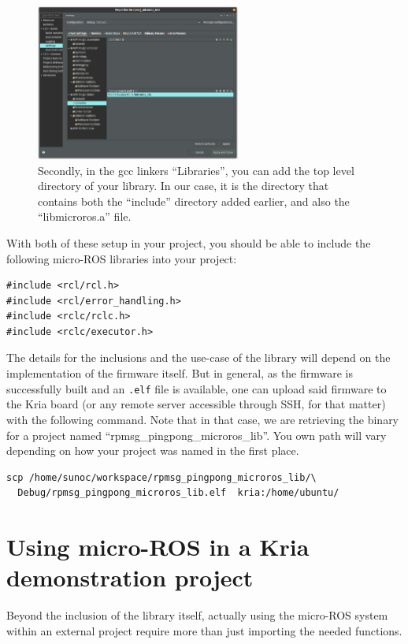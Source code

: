 \documentclass[10pt]{article}
\begin{document}
\begin{figure}[H]
  \centering
  \includegraphics[width=0.6\textwidth]{./img/vitis_new/include2}
  \caption{Secondly, in the gcc linkers ``Libraries'', you can add the top level directory of your library. In our case, it is the
    directory that contains both the ``include'' directory added earlier, and also the ``libmicroros.a'' file.}
\end{figure}

With both of these setup in your project, you should be able to include the following micro-ROS libraries into your project:
\begin{tcolorbox}
\begin{verbatim}
#include <rcl/rcl.h>
#include <rcl/error_handling.h>
#include <rclc/rclc.h>
#include <rclc/executor.h>
\end{verbatim}
\end{tcolorbox}

The details for the inclusions and the use-case of the library will depend on the implementation of the firmware
itself.
But in general, as the firmware is successfully built and an \verb|.elf| file is available, one can upload said
firmware to the Kria board (or any remote server accessible through SSH, for that matter) with the following
command.
Note that in that case, we are retrieving the binary for a project named ``rpmsg\_pingpong\_microros\_lib''.
You own path will vary depending on how your project was named in the first place.
\begin{tcolorbox}
\begin{verbatim}
scp /home/sunoc/workspace/rpmsg_pingpong_microros_lib/\
  Debug/rpmsg_pingpong_microros_lib.elf  kria:/home/ubuntu/
\end{verbatim}
\end{tcolorbox}

\section{Using micro-ROS in a Kria demonstration project}
Beyond the inclusion of the library itself, actually using the micro-ROS system
within an external project require more than just importing the needed
functions.
\end{document}
